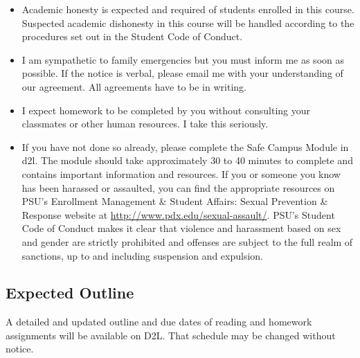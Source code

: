 \documentclass[letterpaper,10pt]{article}
\begin{document}
\begin{itemize}
\item Academic honesty is expected and required of students enrolled
  in this course.  Suspected academic dishonesty in this course will
  be handled according to the procedures set out in the Student Code
  of Conduct.

\item I am sympathetic to family emergencies but you must inform me as
  soon as possible. If the notice is verbal, please email me with your
  understanding of our agreement. All agreements have to be in
  writing.
  
\item I expect homework to be completed by you without consulting your classmates or other human resources.  I take this seriously.  

\item If you have not done so already, please complete the Safe Campus Module in d2l. The module should take approximately 30 to 40 minutes to complete and contains important information and resources. If you or someone you know has been harassed or assaulted, you can find the appropriate resources on PSU’s Enrollment Management \& Student Affairs: Sexual Prevention \& Response website at \url{http://www.pdx.edu/sexual-assault/}. PSU's Student Code of Conduct makes it clear that violence and harassment based on sex and gender are strictly prohibited and offenses are subject to the full realm of sanctions, up to and including suspension and expulsion. 

\end{itemize}

 
\subsection{Expected Outline}
A detailed and updated outline and due dates of reading and homework assignments will be available on D2L.  That schedule may be changed without notice.
\end{document}
